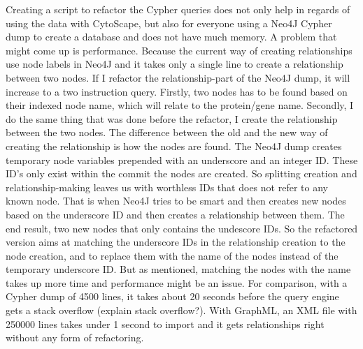 Creating a script to refactor the Cypher queries does not only help in regards
of using the data with CytoScape, but also for everyone using a Neo4J Cypher
dump to create a database and does not have much memory. A problem that might
come up is performance. Because the current way of creating relationships use
node labels in Neo4J and it takes only a single line to create a relationship
between two nodes. If I refactor the relationship-part of the Neo4J dump, it
will increase to a two instruction query. Firstly, two nodes has to be found
based on their indexed node name, which will relate to the protein/gene name.
Secondly, I do the same thing that was done before the refactor, I create the
relationship between the two nodes. The difference between the old and the new
way of creating the relationship is how the nodes are found. The Neo4J dump
creates temporary node variables prepended with an underscore and an integer ID.
These ID's only exist within the commit the nodes are created. So splitting
creation and relationship-making leaves us with worthless IDs that does not
refer to any known node. That is when Neo4J tries to be smart and then creates
new nodes based on the underscore ID and then creates a relationship between
them. The end result, two new nodes that only contains the undescore IDs. So the
refactored version aims at matching the underscore IDs in the relationship
creation to the node creation, and to replace them with the name of the nodes
instead of the temporary underscore ID. But as mentioned, matching the nodes
with the name takes up more time and performance might be an issue. For
comparison, with a Cypher dump of 4500 lines, it takes about 20 seconds before
the query engine gets a stack overflow (explain stack overflow?). With GraphML,
an XML file with 250000 lines takes under 1 second to import and it gets
relationships right without any form of refactoring.
